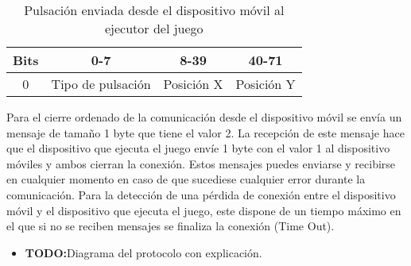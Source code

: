 \begin{table}[h!]
\centering
\begin{tabular}{|l|c|c|c|} 
\hline
Bits                    & 0-7               & 8-39                            & 40-71                            \\ 
\hline
\multicolumn{1}{|c|}{0} & Tipo de pulsaci\'on & \multicolumn{1}{l|}{Posici\'on X} & \multicolumn{1}{l|}{Posici\'on Y}  \\
\hline
\end{tabular}
\caption{Pulsaci\'on enviada desde el dispositivo m\'ovil al ejecutor del juego}
\label{table:2}
\end{table}

Para el cierre ordenado de la comunicaci\'on desde el dispositivo m\'ovil se env\'ia un mensaje de tama\~no 1 byte que tiene el valor 2. La recepci\'on de este mensaje hace que el dispositivo que ejecuta el juego env\'ie 1 byte con el valor 1 al dispositivo m\'oviles y ambos cierran la conexi\'on. Estos mensajes puedes enviarse y recibirse en cualquier momento en caso de que sucediese cualquier error durante la comunicaci\'on. Para la detecci\'on de una p\'erdida de conexi\'on entre el dispositivo m\'ovil y el dispositivo que ejecuta el juego, este dispone de un tiempo m\'aximo en el que si no se reciben mensajes se finaliza la conexi\'on (Time Out).

\begin {itemize}
\item \textbf{TODO:}Diagrama del protocolo con explicaci\'on.
\end {itemize}



